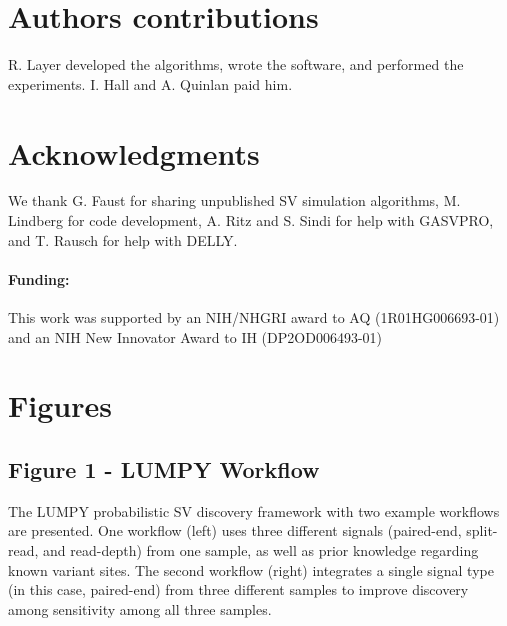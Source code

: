 \documentclass[10pt]{bmc_article}
\def\texttt{[image: ]}
\newenvironment{bmcformat}{\begin{raggedright}\baselineskip20pt\sloppy\setboolean{publ}{false}}{\end{raggedright}\baselineskip20pt\sloppy}
\begin{document}
\begin{bmcformat}
\section*{Authors contributions}
R. Layer developed the algorithms, wrote the software, and performed the
experiments.  I. Hall and A. Quinlan paid him.

\section*{Acknowledgments}
We thank G. Faust for sharing unpublished SV simulation algorithms, M. Lindberg
for code development, A. Ritz and S. Sindi for help with GASVPRO, and T. Rausch
for help with DELLY.

\paragraph{Funding:} This work was supported by an NIH/NHGRI award to
AQ (1R01HG006693-01) and an NIH New Innovator Award to IH (DP2OD006493-01)

%
%

{
   }



\section*{Figures}
\subsection*{Figure 1 - LUMPY Workflow}
The LUMPY probabilistic SV discovery framework with two example
workflows are presented. One workflow (left) uses three different signals
(paired-end, split-read, and read-depth) from one sample, as well as prior
knowledge regarding known variant sites. The second workflow (right) integrates
a single signal type (in this case, paired-end) from three different samples to
improve discovery among sensitivity among all three samples.


\end{bmcformat}
\end{document}

